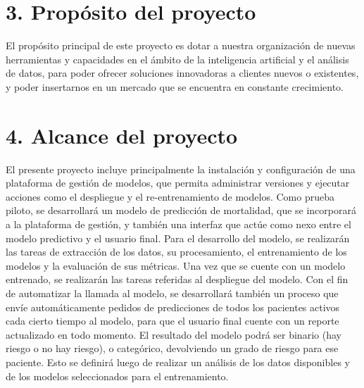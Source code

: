 \documentclass[
11pt, %
]{charter}
\begin{document}
\section{3. Propósito del proyecto}
\label{sec:proposito}

El propósito principal de este proyecto es dotar a nuestra organización de nuevas herramientas y capacidades en el ámbito de la inteligencia artificial y el análisis de datos, para poder ofrecer soluciones innovadoras a clientes nuevos o existentes, y poder insertarnos en un mercado que se encuentra en constante crecimiento. 

\section{4. Alcance del proyecto}
\label{sec:alcance}

El presente proyecto incluye principalmente la instalación y configuración de una plataforma de gestión de modelos, que permita administrar versiones y ejecutar acciones como el despliegue y el re-entrenamiento de modelos.
Como prueba piloto, se desarrollará un modelo de predicción de mortalidad, que se incorporará a la plataforma de gestión, y también una interfaz que actúe como nexo entre el modelo predictivo y el usuario final.
Para el desarrollo del modelo, se realizarán las tareas de extracción de los datos, su procesamiento, el entrenamiento de los modelos y la evaluación de sus métricas. 
Una vez que se cuente con un modelo entrenado, se realizarán las tareas referidas al despliegue del modelo. 
Con el fin de automatizar la llamada al modelo, se desarrollará también un proceso que envíe automáticamente pedidos de predicciones de todos los pacientes activos cada cierto tiempo al modelo, para que el usuario final cuente con un reporte actualizado en todo momento.
El resultado del modelo podrá ser binario (hay riesgo o no hay riesgo), o categórico, devolviendo un grado de riesgo para ese paciente. Esto se definirá luego de realizar un análisis de los datos disponibles y de los modelos seleccionados para el entrenamiento.
\end{document}

